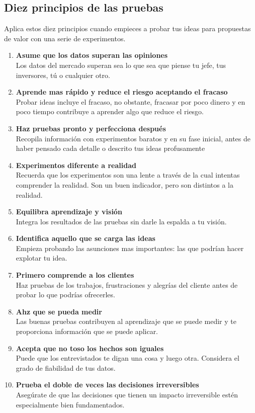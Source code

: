 \documentclass[11pt]{book}
\begin{document}
\subsection{Diez principios de las pruebas}
Aplica estos diez principios cuando empieces a probar tus ideas para propuestas de valor con una serie de experimentos.
\begin{enumerate}
\item \textbf{ Asume que los datos superan las opiniones }\\
Los datos del mercado superan sea lo que sea que piense tu jefe, tus inversores, tú o cualquier otro.
\item \textbf{ Aprende mas rápido y reduce el riesgo aceptando el fracaso }\\
Probar ideas incluye el fracaso, no obstante, fracasar por poco dinero y en poco tiempo contribuye a aprender algo que reduce el riesgo.
\item \textbf{ Haz pruebas pronto y perfecciona después }\\
Recopila información con experimentos baratos y en su fase inicial, antes de haber pensado cada detalle o descrito tus ideas profusamente
\item \textbf{ Experimentos diferente a realidad }\\
Recuerda que los experimentos son una lente a través de la cual intentas comprender la realidad. Son un buen indicador, pero son distintos a la realidad.
\item \textbf{ Equilibra aprendizaje y visión }\\
Integra los resultados de las pruebas sin darle la espalda a tu visión.
\item \textbf{ Identifica aquello que se carga las ideas }\\
Empieza probando las asunciones mas importantes: las que podrían hacer explotar tu idea. 
\item \textbf{ Primero comprende a los clientes }\\
Haz pruebas de los trabajos, frustraciones y alegrías del cliente antes de probar lo que podrías ofrecerles.
\item \textbf{ Ahz que se pueda medir }\\
Las buenas pruebas contribuyen al aprendizaje que se puede medir y te proporciona información que se puede aplicar.
\item \textbf{ Acepta que no toso los hechos son iguales }\\
Puede que los entrevistados te digan una cosa y luego otra. Considera el grado de fiabilidad de tus datos.
\item \textbf{ Prueba el doble de veces las decisiones irreversibles }\\
Asegúrate de que las decisiones que tienen un impacto irreversible estén especialmente bien fundamentados. 
\end{enumerate}
\end{document}
